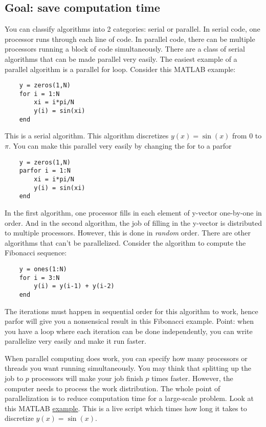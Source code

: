 \documentclass{article}
\begin{document}
\subsection{Goal: save computation time}
You can classify algorithms into 2 categories: serial or parallel. In serial code, one processor runs through each line of code. In parallel code, there can be multiple processors running a block of code simultaneously. There are a class of serial algorithms that can be made parallel very easily. The easiest example of a parallel algorithm is a parallel for loop. Consider this MATLAB example:
\begin{verbatim}
    y = zeros(1,N)
    for i = 1:N
        xi = i*pi/N
        y(i) = sin(xi)
    end
\end{verbatim}
This is a serial algorithm. This algorithm discretizes $y(x)=\sin(x)$ from 0 to $\pi$. You can make this parallel very easily by changing the for to a parfor
\begin{verbatim}
    y = zeros(1,N)
    parfor i = 1:N
        xi = i*pi/N
        y(i) = sin(xi)
    end
\end{verbatim}
In the first algorithm, one processor fills in each element of y-vector one-by-one in order. And in the second algorithm, the job of filling in the y-vector is distributed to multiple processors. However, this is done in \textit{random} order. There are other algorithms that can't be parallelized. Consider the algorithm to compute the Fibonacci sequence:
\begin{verbatim}
    y = ones(1:N)
    for i = 3:N
        y(i) = y(i-1) + y(i-2)
    end
\end{verbatim}
The iterations must happen in sequential order for this algorithm to work, hence parfor will give you a nonsensical result in this Fibonacci example. Point: when you have a loop where each iteration can be done independently, you can write parallelize very easily and make it run faster.

When parallel computing does work, you can specify how many processors or threads you want running simultaneously. You may think that splitting up the job to $p$ processors will make your job finish $p$ times faster. However, the computer needs to process the work distribution. The whole point of parallelization is to reduce computation time for a large-scale problem. Look at this MATLAB \href{https://web.njit.edu/~tt73/Files/599/timing.mlx}{example}. This is a live script which times how long it takes to discretize $y(x)=\sin(x)$.
\end{document}

